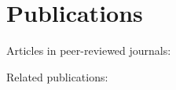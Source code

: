 \chapter*{Publications}

\noindent
Articles in peer-reviewed journals:
\begin{refsection}[ownpubs]
  \small%
  \nocite{*}
  \printbibliography[heading=none,type=article]
\end{refsection}

\noindent
Related publications:
\begin{refsection}[contribs]
  \small%
  \nocite{*}
  \printbibliography[heading=none,type=article]
\end{refsection}
